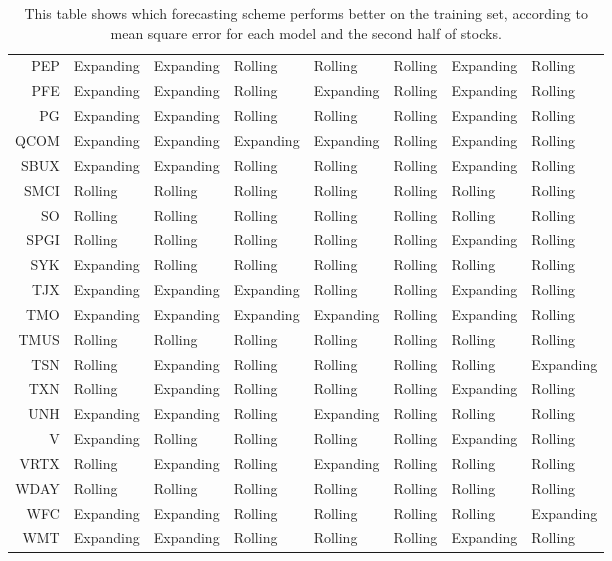 \begin{table}[ht]
\begin{tabular}{rlllllll}
  PEP & Expanding & Expanding & Rolling & Rolling & Rolling & Expanding & Rolling \\ 
  PFE & Expanding & Expanding & Rolling & Expanding & Rolling & Expanding & Rolling \\ 
  PG & Expanding & Expanding & Rolling & Rolling & Rolling & Expanding & Rolling \\ 
  QCOM & Expanding & Expanding & Expanding & Expanding & Rolling & Expanding & Rolling \\ 
  SBUX & Expanding & Expanding & Rolling & Rolling & Rolling & Expanding & Rolling \\ 
  SMCI & Rolling & Rolling & Rolling & Rolling & Rolling & Rolling & Rolling \\ 
  SO & Rolling & Rolling & Rolling & Rolling & Rolling & Rolling & Rolling \\ 
  SPGI & Rolling & Rolling & Rolling & Rolling & Rolling & Expanding & Rolling \\ 
  SYK & Expanding & Rolling & Rolling & Rolling & Rolling & Rolling & Rolling \\ 
  TJX & Expanding & Expanding & Expanding & Rolling & Rolling & Expanding & Rolling \\ 
  TMO & Expanding & Expanding & Expanding & Expanding & Rolling & Expanding & Rolling \\ 
  TMUS & Rolling & Rolling & Rolling & Rolling & Rolling & Rolling & Rolling \\ 
  TSN & Rolling & Expanding & Rolling & Rolling & Rolling & Rolling & Expanding \\ 
  TXN & Rolling & Expanding & Rolling & Rolling & Rolling & Expanding & Rolling \\ 
  UNH & Expanding & Expanding & Rolling & Expanding & Rolling & Rolling & Rolling \\ 
  V & Expanding & Rolling & Rolling & Rolling & Rolling & Expanding & Rolling \\ 
  VRTX & Rolling & Expanding & Rolling & Expanding & Rolling & Rolling & Rolling \\ 
  WDAY & Rolling & Rolling & Rolling & Rolling & Rolling & Rolling & Rolling \\ 
  WFC & Expanding & Expanding & Rolling & Rolling & Rolling & Rolling & Expanding \\ 
  WMT & Expanding & Expanding & Rolling & Rolling & Rolling & Expanding & Rolling \\ 
   \hline
\end{tabular}
\caption[Better scheme MSE (2)]{This table shows which forecasting scheme performs better on the training set, according to mean square error
              for each model and the second half of stocks.} 
\label{Table:Better_MSE_2}
\end{table}
